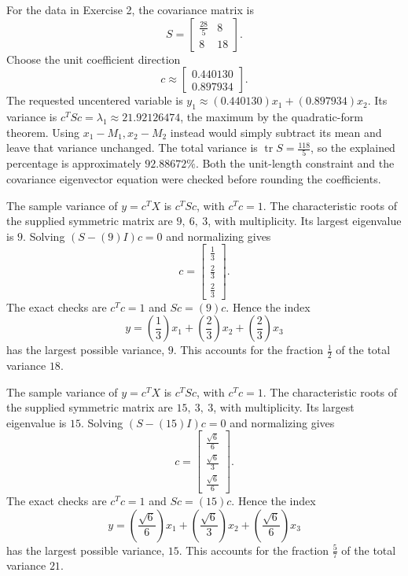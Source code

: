 For the data in Exercise 2, the covariance matrix is
\[S=\begin{bmatrix}\frac{28}{5}&8\\8&18\end{bmatrix}.\]
Choose the unit coefficient direction
\[c\approx\begin{bmatrix}0.440130\\0.897934\end{bmatrix}.\]
The requested uncentered variable is $y_1\approx (0.440130)x_1+(0.897934)x_2$. Its variance is $c^TSc=\lambda_1\approx 21.92126474$, the maximum by the quadratic-form theorem. Using $x_1-M_1,x_2-M_2$ instead would simply subtract its mean and leave that variance unchanged.
The total variance is $\operatorname{tr}S=\frac{118}{5}$, so the explained percentage is approximately $92.88672\%$. Both the unit-length constraint and the covariance eigenvector equation were checked before rounding the coefficients.

The sample variance of $y=c^TX$ is $c^TSc$, with $c^Tc=1$. The characteristic roots of the supplied symmetric matrix are $9,\ 6,\ 3$, with multiplicity. Its largest eigenvalue is $9$. Solving $(S-(9)I)c=0$ and normalizing gives
\[c=\begin{bmatrix}\frac{1}{3}\\\frac{2}{3}\\\frac{2}{3}\end{bmatrix}.\]
The exact checks are $c^Tc=1$ and $Sc=(9)c$. Hence the index
\[y=(\frac{1}{3})x_1 + (\frac{2}{3})x_2 + (\frac{2}{3})x_3\]
has the largest possible variance, $9$. This accounts for the fraction $\frac{1}{2}$ of the total variance $18$.

The sample variance of $y=c^TX$ is $c^TSc$, with $c^Tc=1$. The characteristic roots of the supplied symmetric matrix are $15,\ 3,\ 3$, with multiplicity. Its largest eigenvalue is $15$. Solving $(S-(15)I)c=0$ and normalizing gives
\[c=\begin{bmatrix}\frac{\sqrt{6}}{6}\\\frac{\sqrt{6}}{3}\\\frac{\sqrt{6}}{6}\end{bmatrix}.\]
The exact checks are $c^Tc=1$ and $Sc=(15)c$. Hence the index
\[y=(\frac{\sqrt{6}}{6})x_1 + (\frac{\sqrt{6}}{3})x_2 + (\frac{\sqrt{6}}{6})x_3\]
has the largest possible variance, $15$. This accounts for the fraction $\frac{5}{7}$ of the total variance $21$.

